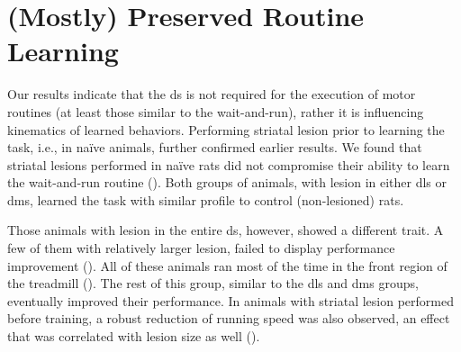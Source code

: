\section[Preserved Routine Learning]{(Mostly) Preserved Routine Learning}
\label{ch:lesion:learn}
Our results indicate that the \gls{ds} is not required for the execution of motor routines (at least those similar to the wait-and-run), rather it is influencing kinematics of learned behaviors.
Performing striatal lesion prior to learning the task, i.e., in na\"{i}ve animals, further confirmed earlier results.
We found that striatal lesions performed in na\"{i}ve rats did not compromise their ability to learn the wait-and-run routine ().
Both groups of animals, with lesion in either \gls{dls} or \gls{dms}, learned the task with similar profile to control (non-lesioned) rats.

Those animals with lesion in the entire \gls{ds}, however, showed a different trait.
A few of them with relatively larger lesion, failed to display performance improvement ().
All of these animals ran most of the time in the front region of the treadmill ().
The rest of this group, similar to the \gls{dls} and \gls{dms} groups, eventually improved their performance.
In animals with striatal lesion performed before training, a robust reduction of running speed was also observed, an effect that was correlated with lesion size as well ().


